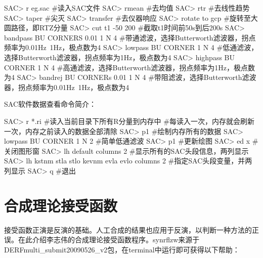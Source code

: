 \documentclass[a4paper]{article}
\begin{document}
\begin{SACCode}
SAC> r eg.sac           #读入SAC文件
SAC> rmean              #去均值
SAC> rtr                #去线性趋势
SAC> taper              #尖灭
SAC> transfer           #去仪器响应
SAC> rotate to gcp      #旋转至大圆路径，即RTZ分量
SAC> cut t1 -50 200     #截取t1时间前50s到后200s
SAC> bandpass BU CORNERS 0.01 1 N 4
     #带通滤波，选择Butterworth滤波器，拐点频率为0.01Hz~1Hz，极点数为4
SAC> lowpass BU CORNER 1 N 4
     #低通滤波，选择Butterworth滤波器，拐点频率为1Hz，极点数为4
SAC> highpass BU CORNER 1 N 4
     #高通滤波，选择Butterworth滤波器，拐点频率为1Hz，极点数为4
SAC> bandrej BU CORNERs 0.01 1 N 4
     #带阻滤波，选择Butterworth滤波器，拐点频率为0.01Hz~1Hz，极点数为4
\end{SACCode}
\clearpage
SAC软件数据查看命令简介：
\begin{SACCode}
SAC> r *.ri                  #读入当前目录下所有R分量到内存中
     #每读入一次，内存就会刷新一次，内存之前读入的数据全部清除
SAC> p1                      #绘制内存所有的数据
SAC> lowpass BU CORNER 1 N 2 #简单低通滤波
SAC> p1                      #更新绘图
SAC> ed x                    #关闭图形窗
SAC> lh default columns 2    #显示所有的SAC头段信息，两列显示
SAC> lh kstnm stla stlo kevnm evla evlo columns 2
     #指定SAC头段变量，并两列显示
SAC> q                       #退出
\end{SACCode}

\clearpage\section{合成理论接受函数}
接受函数正演是反演的基础。人工合成的结果也应用于反演，以判断一种方法的正误。在此介绍李志伟的合成理论接受函数程序。synrflzw来源于DERFmulti\_submit20090526\_v2包，在terminal中运行即可获得以下帮助：\par
\end{document}
